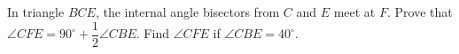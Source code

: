 In triangle $BCE$, the internal angle bisectors from $C$ and $E$ meet at $F$. Prove that $\angle CFE=90^\circ+\dfrac{1}{2}\angle CBE$. Find $\angle CFE$ if $\angle CBE=40^\circ$.
